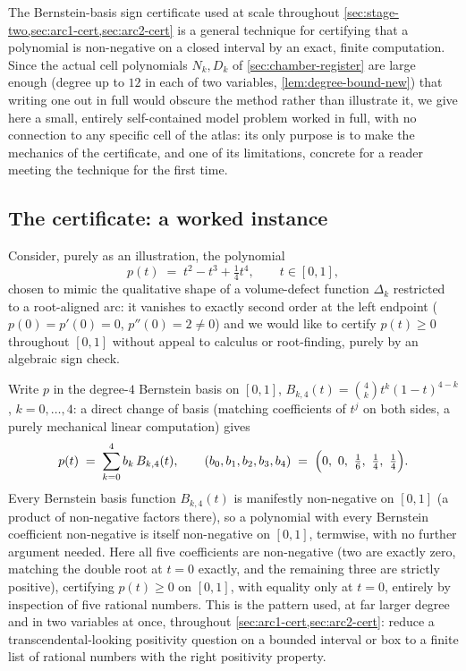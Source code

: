 \documentclass[11pt,reqno]{amsart}
\renewcommand{\_}{\origunderscore\allowbreak}
\numberwithin{equation}{section}
\theoremstyle{plain}
\theoremstyle{definition}
\theoremstyle{remark}
\newcommand{\defect}{\Delta}                 %
\begin{document}
The Bernstein-basis sign certificate used at scale throughout
\cref{sec:stage-two,sec:arc1-cert,sec:arc2-cert} is a general technique
for certifying that a polynomial is non-negative on a closed interval by
an exact, finite computation. Since the actual cell polynomials $N_k,D_k$
of \cref{sec:chamber-register} are large enough (degree up to $12$ in each
of two variables, \cref{lem:degree-bound-new}) that writing one out in
full would obscure the method rather than illustrate it, we give here a
small, entirely self-contained model problem worked in full, with no
connection to any specific cell of the atlas: its only purpose is to make
the mechanics of the certificate, and one of its limitations,
concrete for a reader meeting the technique for the first time.

\subsection{The certificate: a worked instance}

Consider, purely as an illustration, the polynomial
\[
  p(t) \;=\; t^2 - t^3 + \tfrac14 t^4, \qquad t\in[0,1],
\]
chosen to mimic the qualitative shape of a volume-defect function
$\defect_k$ restricted to a root-aligned arc: it vanishes to exactly
second order at the left endpoint ($p(0)=p'(0)=0$, $p''(0)=2\neq0$) and we
would like to certify $p(t)\ge0$ throughout $[0,1]$ without appeal to
calculus or root-finding, purely by an algebraic sign check.

Write $p$ in the degree-$4$ Bernstein basis on $[0,1]$,
$B_{k,4}(t)=\binom4k t^k(1-t)^{4-k}$, $k=0,\dots,4$: a direct change of
basis (matching coefficients of $t^j$ on both sides, a purely mechanical
linear computation) gives
\[
  p(t) \;=\; \sum_{k=0}^4 b_k\,B_{k,4}(t), \qquad
  (b_0,b_1,b_2,b_3,b_4) \;=\; \Bigl(0,\ 0,\ \tfrac16,\ \tfrac14,\ \tfrac14\Bigr).
\]
Every Bernstein basis function $B_{k,4}(t)$ is manifestly non-negative on
$[0,1]$ (a product of non-negative factors there), so a polynomial with
every Bernstein coefficient non-negative is itself non-negative on
$[0,1]$, termwise, with no further argument needed. Here all five
coefficients are non-negative (two are exactly zero, matching the double
root at $t=0$ exactly, and the remaining three are strictly positive),
certifying $p(t)\ge0$ on $[0,1]$, with equality only at $t=0$, entirely by
inspection of five rational numbers. This is the pattern used, at far
larger degree and in two variables at once, throughout
\cref{sec:arc1-cert,sec:arc2-cert}: reduce a transcendental-looking
positivity question on a bounded interval or box to a finite list of
rational numbers with the right positivity property.
\end{document}
